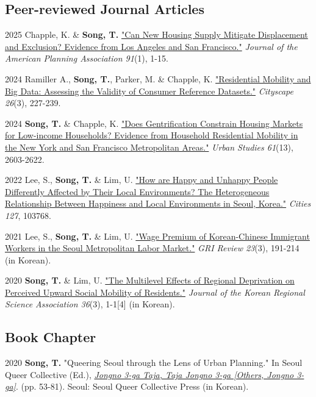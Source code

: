 \documentclass[11pt,letterpaper]{report}
\begin{document}
\subsection*{Peer-reviewed Journal Articles}
\begin{tablist}
\item[2025] \tab{}Chapple, K. \& \textbf{Song, T.} \href{https://doi.org/10.1080/01944363.2024.2319293}{"Can New Housing Supply Mitigate Displacement and Exclusion? Evidence from Los Angeles and San Francisco."} \emph{Journal of the American Planning Association 91}(1), 1-15.
\item[2024] \tab{}Ramiller A., \textbf{Song, T.}, Parker, M. \& Chapple, K. \href{https://www.jstor.org/stable/48799257}{"Residential Mobility and Big Data: Assessing the Validity of Consumer Reference Datasets."} \emph{Cityscape 26}(3), 227-239.
\item[2024] \tab{}\textbf{Song, T.} \& Chapple, K. \href{https://doi.org/10.1177/00420980241244699}{"Does Gentrification Constrain Housing Markets for Low-income Households? Evidence from Household Residential Mobility in the New York and San Francisco Metropolitan Areas."} \emph{Urban Studies 61}(13), 2603-2622.
\item[2022] \tab{}Lee, S., \textbf{Song, T.} \& Lim, U. \href{https://doi.org/10.1016/j.cities.2022.103768}{"How are Happy and Unhappy People Differently Affected by Their Local Environments? The Heterogeneous Relationship Between Happiness and Local Environments in Seoul, Korea."} \emph{Cities 127}, 103768.
\item[2021] \tab{}Lee, S., \textbf{Song, T.} \& Lim, U. \href{https://www.dbpia.co.kr/Journal/articleDetail?nodeId=NODE11025769}{"Wage Premium of Korean-Chinese Immigrant Workers in the Seoul Metropolitan Labor Market."} \emph{GRI Review 23}(3), 191-214 (in Korean).
\item[2020] \tab{}\textbf{Song, T.} \& Lim, U. \href{"https://www.koreascience.or.kr/article/JAKO202030161655441.page}{"The Multilevel Effects of Regional Deprivation on Perceived Upward Social Mobility of Residents."} \emph{Journal of the Korean Regional Science Association 36}(3), 1-1[4] (in Korean).
\end{tablist}
\subsection*{Book Chapter}
\begin{tablist}
\item[2020] \tab{}\textbf{Song, T.} "Queering Seoul through the Lens of Urban Planning." In Seoul Queer Collective (Ed.), \emph{\href{http://www.kyobobook.co.kr/product/detailViewKor.laf?ejkGb=KOR&mallGb=KOR&barcode=9791197096501}{Jongno 3-ga Taja, Taja Jongno 3-ga [Others, Jongno 3-ga]}}. (pp. 53-81). Seoul: Seoul Queer Collective Press (in Korean).
\end{tablist}
\end{document}
